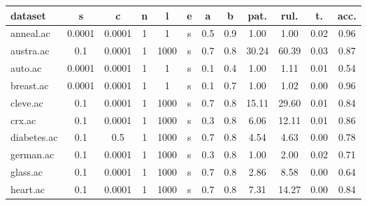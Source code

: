 \begin{table}[htbp]
	\centering
		\begin{tabular}{|l|c|c|c|c|c|c|c||c|c|c|c|}
		\hline
		\textbf{dataset}	& \textbf{s}	& \textbf{c}	& \textbf{n}	& \textbf{l}	& \textbf{e} & \textbf{a} & \textbf{b} & \textbf{pat.}	& \textbf{rul.}	& \textbf{t.}	& \textbf{acc.}	\\
		\hline
		anneal.ac      & 0.0001   & 0.0001      & 1              & 1                   & s        & 0.5    & 0.9   & 1.00           & 1.00           & 0.02           & 0.96           \\
		\hline
		austra.ac      & 0.1      & 0.0001      & 1              & 1000                & s        & 0.7    & 0.8   & 30.24          & 60.39          & 0.03           & 0.87           \\
		\hline
		auto.ac        & 0.0001   & 0.0001      & 1              & 1                   & s        & 0.1    & 0.4   & 1.00           & 1.11           & 0.01           & 0.54           \\
		\hline
		breast.ac      & 0.0001   & 0.0001      & 1              & 1                   & s        & 0.1    & 0.7   & 1.00           & 1.02           & 0.00           & 0.96           \\
		\hline
		cleve.ac       & 0.1      & 0.0001      & 1              & 1000                & s        & 0.7    & 0.8   & 15.11          & 29.60          & 0.01           & 0.84           \\
		\hline
		crx.ac         & 0.1      & 0.0001      & 1              & 1000                & s        & 0.3    & 0.8   & 6.06           & 12.11          & 0.01           & 0.86           \\
		\hline
		diabetes.ac    & 0.1      & 0.5         & 1              & 1000                & s        & 0.7    & 0.8   & 4.54           & 4.63           & 0.00           & 0.78           \\
		\hline
		german.ac      & 0.1      & 0.0001      & 1              & 1000                & s        & 0.3    & 0.8   & 1.00           & 2.00           & 0.02           & 0.71           \\
		\hline
		glass.ac       & 0.1      & 0.0001      & 1              & 1000                & s        & 0.7    & 0.8   & 2.86           & 8.58           & 0.00           & 0.64           \\
		\hline
		heart.ac       & 0.1      & 0.0001      & 1              & 1000                & s        & 0.7    & 0.8   & 7.31           & 14.27          & 0.00           & 0.84           \\

\end{tabular}
\end{table}
